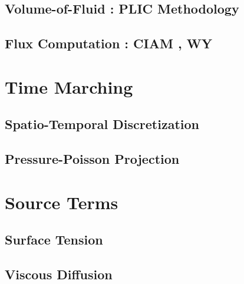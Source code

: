 \subsection*{Volume-of-Fluid : PLIC Methodology}
\blindtext

\subsection*{Flux Computation : CIAM , WY}
\blindtext


\section{Time Marching}

\subsection*{Spatio-Temporal Discretization}
\blindtext

\subsection*{Pressure-Poisson Projection}
\blindtext

\section{Source Terms}

\subsection*{Surface Tension}


\subsection*{Viscous Diffusion}

\blindtext
